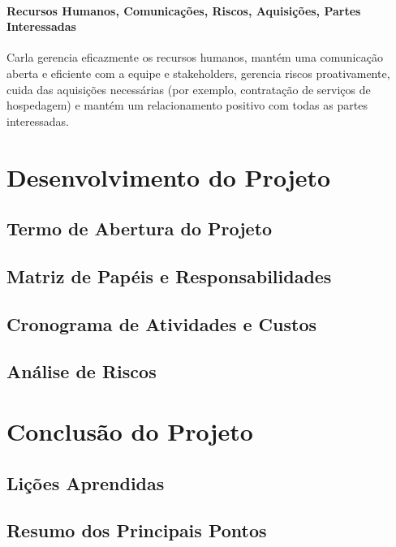 \documentclass[
	12pt,				%
	openright,			%
	twoside,			%
	a4paper,			%
	english,			%
	brazil				%
	]{abntex2}
\begin{document}
\subsection{Recursos Humanos, Comunicações, Riscos, Aquisições, Partes Interessadas}
Carla gerencia eficazmente os recursos humanos, mantém uma comunicação aberta e eficiente com a equipe e stakeholders, gerencia riscos proativamente, cuida das aquisições necessárias (por exemplo, contratação de serviços de hospedagem) e mantém um relacionamento positivo com todas as partes interessadas.



\part{Desenvolvimento do Projeto}

\chapter{Termo de Abertura do Projeto}\label{cap_termo_de_abertura_do_projeto}

\chapter{Matriz de Papéis e Responsabilidades}\label{cap_matriz_de_papeis_e_responsabilidades}

\chapter{Cronograma de Atividades e Custos}\label{cap_cronograma_de_atividades_e_custos}

\chapter{Análise de Riscos}\label{cap_analise_de_riscos}



\part{Conclusão do Projeto}

\chapter{Lições Aprendidas}\label{cap_conclusao_do_projeto}

\chapter{Resumo dos Principais Pontos}\label{cap_resumo_dos_principais_pontos}
\end{document}
